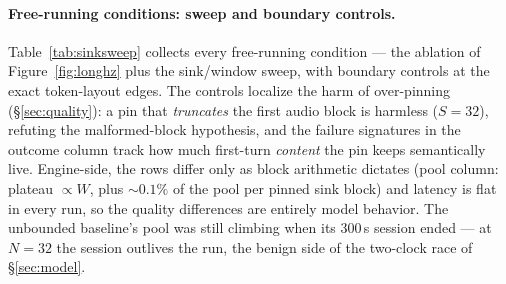 \paragraph{Free-running conditions: sweep and boundary controls.} Table~\ref{tab:sinksweep} collects
every free-running condition --- the ablation of Figure~\ref{fig:longhz} plus the sink/window sweep,
with boundary controls at the exact token-layout edges. The controls localize the harm of
over-pinning (\S\ref{sec:quality}): a pin that \emph{truncates} the first audio block is harmless
($S{=}32$), refuting the malformed-block hypothesis, and the failure signatures in the outcome column
track how much first-turn \emph{content} the pin keeps semantically live. Engine-side, the rows
differ only as block arithmetic dictates (pool column: plateau $\propto W$, plus ${\sim}0.1\%$ of the
pool per pinned sink block) and latency is flat in every run, so the quality differences are entirely
model behavior. The unbounded baseline's pool was still climbing when its 300\,s session ended --- at
$N{=}32$ the session outlives the run, the benign side of the two-clock race of \S\ref{sec:model}.

